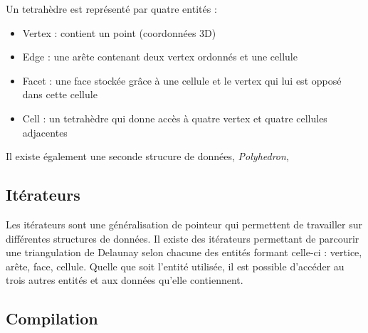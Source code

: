 Un tetrahèdre est représenté par quatre entités :
\begin{itemize}
  \item Vertex : contient un point (coordonnées 3D)
  \item Edge : une arête contenant deux vertex ordonnés et une cellule
  \item Facet : une face stockée grâce à une cellule et le vertex qui lui est opposé dans cette cellule
  \item Cell : un tetrahèdre qui donne accès à quatre vertex et quatre cellules adjacentes
\end{itemize}

Il existe également une seconde strucure de données, \textit{Polyhedron}, 









\subsection*{Itérateurs}

Les itérateurs sont une généralisation de pointeur qui permettent de travailler sur
différentes structures de données.
Il existe des itérateurs permettant de parcourir une triangulation de Delaunay
selon chacune des entités formant celle-ci : vertice, arête, face, cellule. Quelle
que soit l'entité utilisée, il est possible d'accéder au trois autres entités et
aux données qu'elle contiennent.

\subsection*{Compilation}
